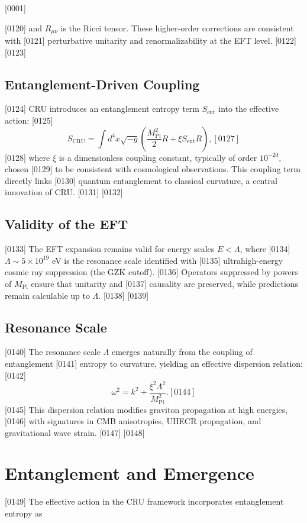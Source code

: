 [0001] \documentclass[12pt]{report}
[0002] \usepackage[utf8]{inputenc}
\begin{document}
[0120] and $R_{\mu\nu}$ is the Ricci tensor. These higher-order corrections are consistent with 
[0121] perturbative unitarity and renormalizability at the EFT level.
[0122] 
[0123] \section{Entanglement-Driven Coupling}
[0124] CRU introduces an entanglement entropy term $S_{\text{ent}}$ into the effective action:
[0125] \begin{equation}
[0126] S_{\text{CRU}} = \int d^4x \sqrt{-g} \left( \frac{M_{\text{Pl}}^2}{2} R + \xi S_{\text{ent}} R \right),
[0127] \end{equation}
[0128] where $\xi$ is a dimensionless coupling constant, typically of order $10^{-20}$, chosen 
[0129] to be consistent with cosmological observations. This coupling term directly links 
[0130] quantum entanglement to classical curvature, a central innovation of CRU.
[0131] 
[0132] \section{Validity of the EFT}
[0133] The EFT expansion remains valid for energy scales $E < \Lambda$, where 
[0134] $\Lambda \sim 5 \times 10^{19}$ eV is the resonance scale identified with 
[0135] ultrahigh-energy cosmic ray suppression (the GZK cutoff). 
[0136] Operators suppressed by powers of $M_{\text{Pl}}$ ensure that unitarity and 
[0137] causality are preserved, while predictions remain calculable up to $\Lambda$.
[0138] 
[0139] \section{Resonance Scale}
[0140] The resonance scale $\Lambda$ emerges naturally from the coupling of entanglement 
[0141] entropy to curvature, yielding an effective dispersion relation:
[0142] \begin{equation}
[0143] \omega^2 = k^2 + \frac{\xi^2 \Lambda^2}{M_{\text{Pl}}^2}.
[0144] \end{equation}
[0145] This dispersion relation modifies graviton propagation at high energies, 
[0146] with signatures in CMB anisotropies, UHECR propagation, and gravitational wave strain.
[0147] 
[0148] \chapter{Entanglement and Emergence}
[0149] The effective action in the CRU framework incorporates entanglement entropy as 
\end{document}
